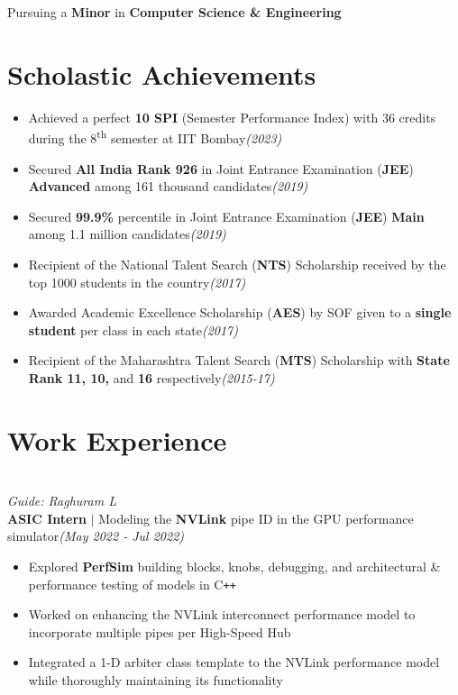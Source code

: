 \documentclass[10pt, a4paper]{article}
\newcommand{\lhsmall}[1]{{\small{\textit{#1}}}}
\newcommand{\rhsmall}[1]{\hfill{\footnotesize{\textsl{(#1)}}}}
\newcommand{\rhsmalle}[1]{\hfill{\footnotesize{\textsl{(#1)}}}\\[-12pt]}
\newcommand{\CFont}{\fontsize{11}{13.2}\selectfont}
\newcommand{\head}[1]{\vspace{0.2em}{\CFont{\textbf{#1}}}}
\begin{document}
\thispagestyle{firstpage}
Pursuing a \textbf{Minor} in \textbf{Computer Science \& Engineering}
\section{Scholastic Achievements}
\begin{itemize}
	\item Achieved a perfect \textbf{10 SPI} (Semester Performance Index) with 36 credits during the 8\textsuperscript{th} semester at IIT Bombay\rhsmall{2023}
	\item Secured \textbf{All India Rank 926} in Joint Entrance Examination (\textbf{JEE}) \textbf{Advanced} among 161 thousand candidates\rhsmall{2019}
	\item Secured \textbf{99.9\%} percentile in Joint Entrance Examination (\textbf{JEE}) \textbf{Main} among 1.1 million candidates\rhsmall{2019}
	\item Recipient of the National Talent Search (\textbf{NTS}) Scholarship received by the top 1000 students in the country\rhsmall{2017}
	\item Awarded Academic Excellence Scholarship (\textbf{AES}) by SOF given to a \textbf{single  student} per class in each state\rhsmall{2017}%
	\item Recipient of the Maharashtra Talent Search (\textbf{MTS}) Scholarship  with \textbf{State Rank 11, 10,} and \textbf{16} respectively\rhsmall{2015-17}%
\end{itemize}
\section{Work Experience}
\vspace{-0.2em}
\head{NVIDIA $\mid$ GPU Subsystem}\\
\lhsmall{Guide: Raghuram L}\\
{\small\textbf{ASIC Intern} $\mid$ Modeling the \textbf{NVLink} pipe ID in the GPU performance simulator}\rhsmalle{May 2022 - Jul 2022}
\begin{itemize}
	\item Explored \textbf{PerfSim} building blocks, knobs, debugging, and architectural \& performance testing of models in C\texttt{++}
	\item Worked on enhancing the NVLink interconnect performance model to incorporate multiple pipes per High-Speed Hub%
	\item Integrated a 1-D arbiter class template to the NVLink performance model while thoroughly maintaining its functionality
\end{itemize}
\end{document}

